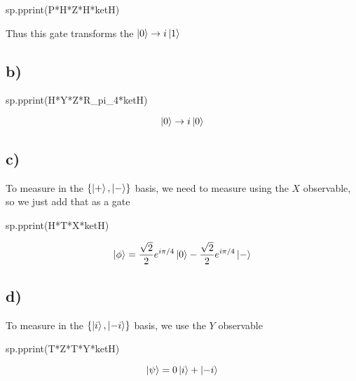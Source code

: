 \documentclass[]{article}
\newenvironment{Shaded}{\begin{snugshade}}{\end{snugshade}}
\newcommand{\NormalTok}[1]{#1}
\begin{document}
\begin{Shaded}
\begin{Highlighting}[]
\NormalTok{sp.pprint(P*H*Z*H*ketH)}
\end{Highlighting}
\end{Shaded}

Thus this gate transforms the \(\ket{0} \to i\ket{1}\)

\hypertarget{b-1}{%
\subsection{b)}\label{b-1}}

\begin{Shaded}
\begin{Highlighting}[]
\NormalTok{sp.pprint(H*Y*Z*R\_pi\_4*ketH)}
\end{Highlighting}
\end{Shaded}

\[
\ket{0}\to i\ket{0}  
\]

\hypertarget{c-1}{%
\subsection{c)}\label{c-1}}

To measure in the \(\left\{ \ket{+},\ket{-} \right\}\) basis, we need to
measure using the \(X\) observable, so we just add that as a gate

\begin{Shaded}
\begin{Highlighting}[]
\NormalTok{sp.pprint(H*T*X*ketH)}
\end{Highlighting}
\end{Shaded}

\[
\ket{\phi}  = \frac{\sqrt{ 2 }}{2}e^{ i\pi/4 }\ket{0} -\frac{\sqrt{ 2 }}{2}e^{ i\pi/4 }\ket{-} 
\]

\hypertarget{d}{%
\subsection{d)}\label{d}}

To measure in the \(\left\{ \ket{i},\ket{-i} \right\}\) basis, we use
the \(Y\) observable

\begin{Shaded}
\begin{Highlighting}[]
\NormalTok{sp.pprint(T*Z*T*Y*ketH)}
\end{Highlighting}
\end{Shaded}

\[
\ket{\psi}  = 0\ket{i} +\ket{-i}  
\]
\end{document}
